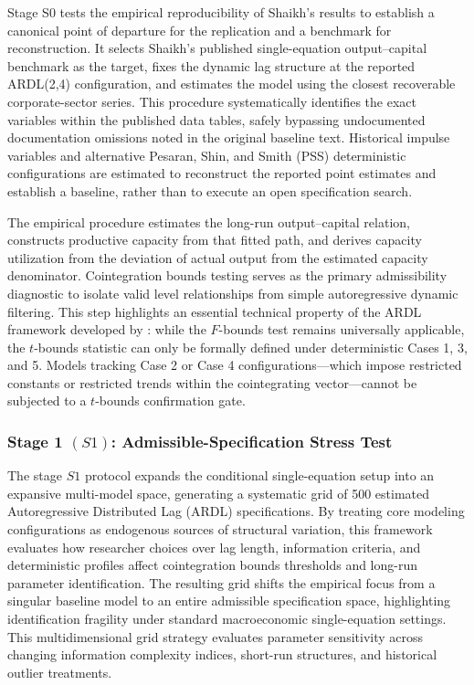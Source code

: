 \documentclass[11pt]{article}
\begin{document}
Stage S0 tests the empirical reproducibility of Shaikh's results to establish a canonical point of departure for the replication and a benchmark for reconstruction. It selects Shaikh's published single-equation output--capital benchmark as the target, fixes the dynamic lag structure at the reported ARDL(2,4) configuration, and estimates the model using the closest recoverable corporate-sector series. This procedure systematically identifies the exact variables within the published data tables, safely bypassing undocumented documentation omissions noted in the original baseline text. Historical impulse variables and alternative Pesaran, Shin, and Smith (PSS) deterministic configurations are estimated to reconstruct the reported point estimates and establish a baseline, rather than to execute an open specification search.

The empirical procedure estimates the long-run output--capital relation, constructs productive capacity from that fitted path, and derives capacity utilization from the deviation of actual output from the estimated capacity denominator. Cointegration bounds testing serves as the primary admissibility diagnostic to isolate valid level relationships from simple autoregressive dynamic filtering. This step highlights an essential technical property of the ARDL framework developed by \citet{Pesaran2001}: while the $F$-bounds test remains universally applicable, the $t$-bounds statistic can only be formally defined under deterministic Cases 1, 3, and 5. Models tracking Case 2 or Case 4 configurations—which impose restricted constants or restricted trends within the cointegrating vector—cannot be subjected to a $t$-bounds confirmation gate.

\subsubsection{Stage 1 \texorpdfstring{$(S1)$}{}: Admissible-Specification Stress Test}
\label{subsec:S1_admissible_spec}

The stage $S1$ protocol expands the conditional single-equation setup into an expansive multi-model space, generating a systematic grid of 500 estimated Autoregressive Distributed Lag (ARDL) specifications. By treating core modeling configurations as endogenous sources of structural variation, this framework evaluates how researcher choices over lag length, information criteria, and deterministic profiles affect cointegration bounds thresholds and long-run parameter identification. The resulting grid shifts the empirical focus from a singular baseline model to an entire admissible specification space, highlighting identification fragility under standard macroeconomic single-equation settings. This multidimensional grid strategy evaluates parameter sensitivity across changing information complexity indices, short-run structures, and historical outlier treatments.
\end{document}
